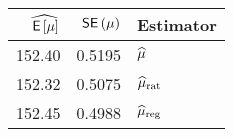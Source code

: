 \begin{table}[ht]
\centering
\begin{tabular}{rrl}
  \hline
$\widehat{\,\mathsf{E}\left[\mu\right]}$ & $\,\mathsf{SE}\left(\mu\right)$ & Estimator \\ 
  \hline
152.40 & 0.5195 & $\widehat{\mu}$ \\ 
  152.32 & 0.5075 & $\widehat{\mu}_\text{rat}$ \\ 
  152.45 & 0.4988 & $\widehat{\mu}_\text{reg}$ \\ 
   \hline
\end{tabular}
\end{table}

